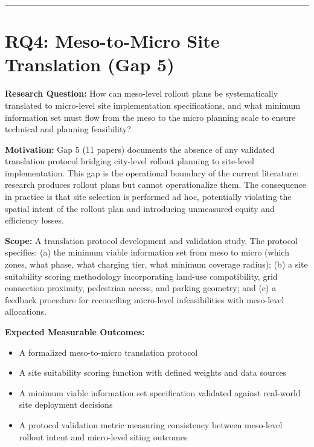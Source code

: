 \documentclass[letterpaper, 12pt, oneside, doublespacing]{Thesis}
\begin{document}
\bigskip\noindent\rule{\linewidth}{0.4pt}\bigskip


\section{RQ4: Meso-to-Micro Site Translation (Gap 5)}


\noindent \textbf{Research Question:} How can meso-level rollout plans be systematically translated to micro-level site implementation specifications, and what minimum information set must flow from the meso to the micro planning scale to ensure technical and planning feasibility?



\noindent \textbf{Motivation:} Gap 5 (11 papers) documents the absence of any validated translation protocol bridging city-level rollout planning to site-level implementation. This gap is the operational boundary of the current literature: research produces rollout plans but cannot operationalize them. The consequence in practice is that site selection is performed ad hoc, potentially violating the spatial intent of the rollout plan and introducing unmeasured equity and efficiency losses.



\noindent \textbf{Scope:} A translation protocol development and validation study. The protocol specifies: (a) the minimum viable information set from meso to micro (which zones, what phase, what charging tier, what minimum coverage radius); (b) a site suitability scoring methodology incorporating land-use compatibility, grid connection proximity, pedestrian access, and parking geometry; and (c) a feedback procedure for reconciling micro-level infeasibilities with meso-level allocations.



\noindent \textbf{Expected Measurable Outcomes:}

\begin{itemize}
  \item A formalized meso-to-micro translation protocol
  \item A site suitability scoring function with defined weights and data sources
  \item A minimum viable information set specification validated against real-world site deployment decisions
  \item A protocol validation metric measuring consistency between meso-level rollout intent and micro-level siting outcomes
\end{itemize}
\end{document}
